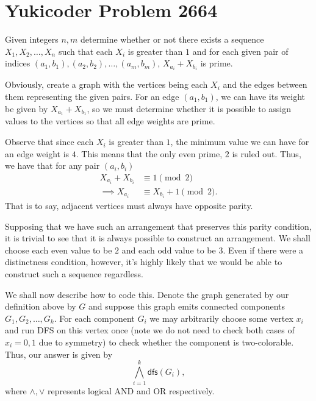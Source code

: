 \documentclass[a4paper, 12pt]{article}
\begin{document}
\section*{Yukicoder Problem 2664}

\begin{chirpbox}
    \begin{problem}
        Given integers \( n, m \) determine whether or not there exists a
        sequence \( X_1, X_2, \ldots, X_n \) such that each \( X_i \) is
        greater than \( 1 \) and for each given pair of indices \( (a_1, b_1), (a_2, b_2),
        \ldots, (a_m, b_m) \), \( X_{a_i} + X_{b_i} \) is prime.
    \end{problem}
\end{chirpbox}

\begin{solution}
    Obviously, create a graph with the vertices being each \( X_i \) and the
    edges between them representing the given pairs. For an edge \( (a_1, b_1)
    \), we can have its weight be given by \( X_{a_1} + X_{b_1} \), so we must
    determine whether it is possible to assign values to the vertices so that
    all edge weights are prime.

    Observe that since each \( X_i \) is greater than \( 1 \), the minimum value we can have for an edge weight is \( 4 \). This means that the only even prime, \( 2 \) is ruled out. Thus, we have that for any pair \( (a_i, b_i) \)
    \begin{align*}
        X_{a_i} + X_{b_i} &\equiv 1 \pmod{2} \\
        \implies X_{a_i} &\equiv X_{b_i} + 1 \pmod{2}
    .\end{align*}
    That is to say, adjacent vertices must always have opposite parity.
    
    Supposing that we have such an arrangement that preserves this parity
    condition, it is trivial to see that it is always possible to construct an
    arrangement. We shall choose each even value to be \( 2 \) and each odd value to be \( 3 \). Even if there were a distinctness condition, however, it's highly likely that we would be able to construct such a sequence regardless.

    We shall now describe how to code this. Denote the graph generated by our definition above by \( G \) and suppose this graph emits connected components \( G_1, G_2, \ldots, G_k \). For each component \( G_i \) we may arbitrarily choose some vertex \( x_i \) and run DFS on this vertex once (note we do not need to check both cases of \( x_i = 0, 1 \) due to symmetry) to check whether the component is two-colorable. Thus, our answer is given by
    \[
        \bigwedge_{i = 1}^k \textsf{dfs}(G_i)
    ,\]
    where \( \wedge, \vee \) represents logical AND and OR respectively.
\end{solution}
\end{document}
